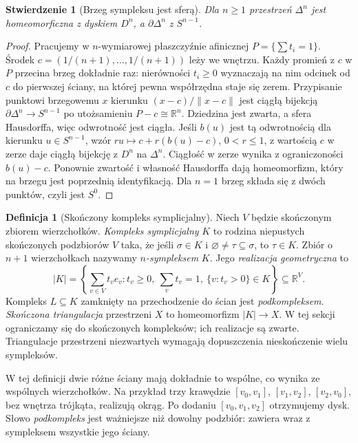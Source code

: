 \documentclass[11pt,a4paper,oneside]{report}
\newcommand{\R}{\mathbb{R}}
\theoremstyle{plain}
\newtheorem{stwierdzenie}[twierdzenie]{Stwierdzenie}
\theoremstyle{definition}
\newtheorem{definicja}[twierdzenie]{Definicja}
\theoremstyle{remark}
\begin{document}
\begin{stwierdzenie}[Brzeg sympleksu jest sferą]
\label{prop:brzeg-sympleksu}
Dla $n\geq1$ przestrzeń $\Delta^n$
jest homeomorficzna z dyskiem $D^n$,
a $\partial\Delta^n$ z $S^{n-1}$.
\end{stwierdzenie}
\begin{proof}
Pracujemy w $n$-wymiarowej płaszczyźnie
afinicznej $P=\{\sum t_i=1\}$.
Środek $c=(1/(n+1),\ldots,1/(n+1))$
leży we wnętrzu. Każdy promień z $c$
w $P$ przecina brzeg dokładnie raz:
nierówności $t_i\geq0$ wyznaczają
na nim odcinek od $c$ do pierwszej
ściany, na której pewna współrzędna
staje się zerem.
Przypisanie punktowi brzegowemu
$x$ kierunku $(x-c)/\|x-c\|$
jest ciągłą bijekcją
$\partial\Delta^n\to S^{n-1}$
po utożsamieniu $P-c\cong\R^n$.
Dziedzina jest zwarta, a sfera
Hausdorffa, więc odwrotność jest
ciągła. Jeśli $b(u)$ jest tą odwrotnością dla kierunku
$u\in S^{n-1}$, wzór $ru\mapsto c+r(b(u)-c)$, $0<r\leq1$,
z wartością $c$ w zerze daje ciągłą bijekcję z $D^n$ na $\Delta^n$.
Ciągłość w zerze wynika z ograniczoności $b(u)-c$.
Ponownie zwartość i własność Hausdorffa dają homeomorfizm,
który na brzegu jest poprzednią identyfikacją. Dla $n=1$ brzeg
składa się z dwóch punktów,
czyli jest $S^0$.
\end{proof}

\begin{definicja}[Skończony kompleks symplicjalny]
\label{def:kompleks-symplicjalny}
Niech $V$ będzie skończonym zbiorem
wierzchołków. \emph{Kompleks symplicjalny}
$K$ to rodzina niepustych skończonych
podzbiorów $V$ taka, że jeśli
$\sigma\in K$ i $\varnothing\ne\tau\subseteq\sigma$,
to $\tau\in K$. Zbiór o $n+1$
wierzchołkach nazywamy
\emph{$n$-sympleksem} $K$.
Jego \emph{realizacja geometryczna} to
\[
 |K|=\left\{\sum_{v\in V}t_v e_v:
 t_v\geq0,\ \sum_v t_v=1,\
 \{v:t_v>0\}\in K\right\}\subseteq\R^{V}.
\]
Kompleks $L\subseteq K$ zamknięty
na przechodzenie do ścian jest
\emph{podkompleksem}.
\emph{Skończona triangulacja} przestrzeni $X$
to homeomorfizm $|K|\to X$. W tej sekcji ograniczamy się do
skończonych kompleksów; ich realizacje są zwarte. Triangulacje
przestrzeni niezwartych wymagają dopuszczenia nieskończenie wielu sympleksów.
\end{definicja}

W tej definicji dwie różne ściany
mają dokładnie to wspólne, co
wynika ze wspólnych wierzchołków.
Na przykład trzy krawędzie
$[v_0,v_1]$, $[v_1,v_2]$,
$[v_2,v_0]$, bez wnętrza trójkąta,
realizują okrąg. Po dodaniu
$[v_0,v_1,v_2]$ otrzymujemy dysk.
Słowo \emph{podkompleks} jest
ważniejsze niż dowolny podzbiór:
zawiera wraz z sympleksem
wszystkie jego ściany.
\end{document}
